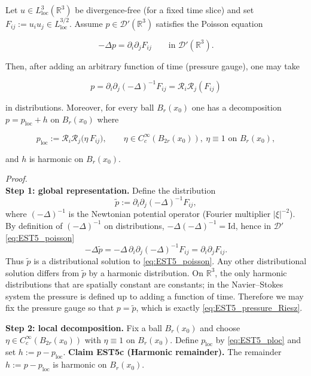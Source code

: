 \documentclass[
  11pt,
]{article}
\begin{document}
Let \(u\in L^3_{\mathrm{loc}}(\mathbb R^3)\) be divergence-free (for a fixed time slice) and set \(F_{ij}:=u_i u_j\in L^{3/2}_{\mathrm{loc}}\). Assume \(p\in\mathcal D'(\mathbb R^3)\) satisfies the Poisson equation

\begin{equation}
-\Delta p = \partial_i\partial_j F_{ij}
\qquad\text{in }\mathcal D'(\mathbb R^3).
\tag{EST5a}\label{eq:EST5_poisson}
\end{equation}

Then, after adding an arbitrary function of time (pressure gauge), one may take

\begin{equation}
p = \partial_i\partial_j(-\Delta)^{-1}F_{ij}=\mathcal R_i\mathcal R_j(F_{ij})
\tag{EST5}\label{eq:EST5_pressure_Riesz}
\end{equation}

in distributions. Moreover, for every ball \(B_r(x_0)\) one has a decomposition \(p=p_{\mathrm{loc}}+h\) on \(B_r(x_0)\) where

\begin{equation}
p_{\mathrm{loc}}:=\mathcal R_i\mathcal R_j\big(\eta\,F_{ij}\big),\qquad \eta\in C_c^\infty(B_{2r}(x_0)),\ \eta\equiv 1 \text{ on }B_r(x_0),
\tag{EST5b}\label{eq:EST5_ploc}
\end{equation}

and \(h\) is harmonic on \(B_r(x_0)\).

\emph{Proof.}\\
\textbf{Step 1: global representation.} Define the distribution \[
\tilde p:=\partial_i\partial_j(-\Delta)^{-1}F_{ij},
\] where \((-\Delta)^{-1}\) is the Newtonian potential operator (Fourier multiplier \(|\xi|^{-2}\)). By definition of \((-\Delta)^{-1}\) on distributions, \(-\Delta(-\Delta)^{-1}=\mathrm{Id}\), hence in \(\mathcal D'\) \eqref{eq:EST5_poisson} \[
-\Delta\tilde p = -\Delta\,\partial_i\partial_j(-\Delta)^{-1}F_{ij} = \partial_i\partial_jF_{ij}.
\] Thus \(\tilde p\) is a distributional solution to \eqref{eq:EST5_poisson}. Any other distributional solution differs from \(\tilde p\) by a harmonic distribution. On \(\mathbb R^3\), the only harmonic distributions that are spatially constant are constants; in the Navier--Stokes system the pressure is defined up to adding a function of time. Therefore we may fix the pressure gauge so that \(p=\tilde p\), which is exactly \eqref{eq:EST5_pressure_Riesz}.

\textbf{Step 2: local decomposition.} Fix a ball \(B_r(x_0)\) and choose \(\eta\in C_c^\infty(B_{2r}(x_0))\) with \(\eta\equiv 1\) on \(B_r(x_0)\). Define \(p_{\mathrm{loc}}\) by \eqref{eq:EST5_ploc} and set \(h:=p-p_{\mathrm{loc}}\). \textbf{Claim EST5c (Harmonic remainder).} The remainder \(h:=p-p_{\mathrm{loc}}\) is harmonic on \(B_r(x_0)\).
\end{document}
